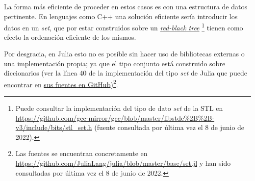 La forma más eficiente de proceder en estos casos
es con una estructura de datos pertinente. 
En lenguajes como C++ una solución eficiente sería introducir los datos en 
un \textit{set}, que por estar construidos sobre un \href{https://en.wikipedia.org/wiki/Red–black_tree}{\textit{red-black tree}}
\footnote{ 
    Puede consultar la implementación del tipo de dato \textit{set} de la STL en 
    \url{https://github.com/gcc-mirror/gcc/blob/master/libstdc\%2B\%2B-v3/include/bits/stl_set.h}
    (fuente consultada por última vez el 8 de junio de 2022).      
}
tienen como efecto la ordenación eficiente de los mismos. 

\setlength{\marginparwidth}{\smallMarginSize}
\reversemarginpar
{}
\setlength{\marginparwidth}{\bigMarginSize}
\normalmarginpar
Por desgracia, en Julia esto no es posible sin hacer uso de bibliotecas externas o una implementación propia; ya que el tipo conjunto está
 construido sobre diccionarios
 (ver la línea 40 de la implementación del tipo \textit{set} de Julia que puede
 encontrar en   \href{https://github.com/JuliaLang/julia/blob/master/base/set.jl}{sus fuentes en GitHub})\footnote{
     Las fuentes se encuentran concretamente en 
     \url{https://github.com/JuliaLang/julia/blob/master/base/set.jl}
     y han sido consultadas por última vez el 8 de junio de 2022.
 }.

